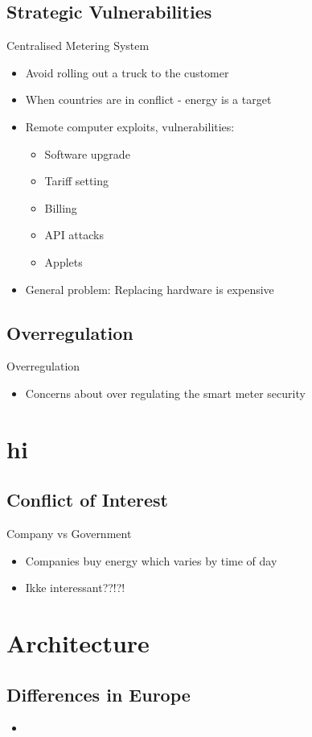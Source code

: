 \documentclass[10pt]{beamer}
\begin{document}
\subsection{Strategic Vulnerabilities}
\begin{frame}{Centralised Metering System}
\begin{itemize}
	\item Avoid rolling out a truck to the customer
	\item When countries are in conflict - energy is a target
	\item Remote computer exploits, vulnerabilities:
	\begin{itemize}
		\item Software upgrade
		\item Tariff setting
		\item Billing
		\item API attacks
		\item Applets
	\end{itemize}
	\item General problem: Replacing hardware is expensive
\end{itemize}
\end{frame}

\subsection{Overregulation}
\begin{frame}{Overregulation}
	\begin{itemize}
		\item Concerns about over regulating the smart meter security
	\end{itemize}
	
\end{frame}

\section{hi}
\subsection{Conflict of Interest}
\begin{frame}{Company vs Government}
	\begin{itemize}
		\item Companies buy energy which varies by time of day
		\item Ikke interessant??!?!
	\end{itemize}
\end{frame}

\section{Architecture}
\subsection{Differences in Europe}
\begin{frame}
	\begin{itemize}
		\item 
	\end{itemize}
\end{frame}

{\aauwavesbg
\begin{frame}
\end{frame}}
\end{document}
